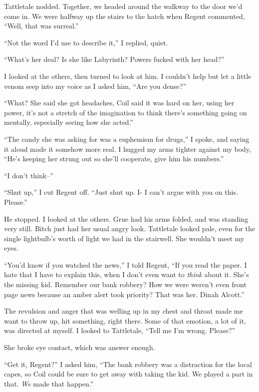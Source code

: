 Tattletale nodded.  Together, we headed around the walkway to the door we'd come in.  We were halfway up the stairs to the hatch when Regent commented, ``Well, that was surreal.''



``Not the word I'd use to describe it,'' I replied, quiet.



``What's her deal?  Is she like Labyrinth?  Powers fucked with her head?''



I looked at the others, then turned to look at him.  I couldn't help but let a little venom seep into my voice as I asked him, ``Are you dense?''



``What?  She said she got headaches, Coil said it was hard on her, using her power, it's not a stretch of the imagination to think there's something going on mentally, especially seeing how she acted.''



``The candy she was asking for was a euphemism for drugs,'' I spoke, and saying it aloud made it somehow more real.  I hugged my arms tighter against my body, ``He's keeping her strung out so she'll cooperate, give him his numbers.''



``I don't think--''



``Shut up,'' I cut Regent off.  ``Just shut up.  I- I can't argue with you on this.  Please.''



He stopped.  I looked at the others.  Grue had his arms folded, and was standing very still.  Bitch just had her usual angry look.  Tattletale looked pale, even for the single lightbulb's worth of light we had in the stairwell.  She wouldn't meet my eyes.



``You'd know if you watched the news,'' I told Regent, ``If you read the paper.  I hate that I have to explain this, when I don't even want to \emph{think} about it.  She's the missing kid.  Remember our bank robbery?  How we were weren't even front page news because an amber alert took priority?  That was her.  Dinah Alcott.''



The revulsion and anger that was welling up in my chest and throat made me want to throw up, hit something, right there.  Some of that emotion, a lot of it, was directed at myself.  I looked to Tattletale, ``Tell me I'm wrong.  Please?''



She broke eye contact, which was answer enough.



``Get it, Regent?'' I asked him, ``The bank robbery was a distraction for the local capes, so Coil could be sure to get away with taking the kid.  We played a part in that. \emph{We} made that happen.''





